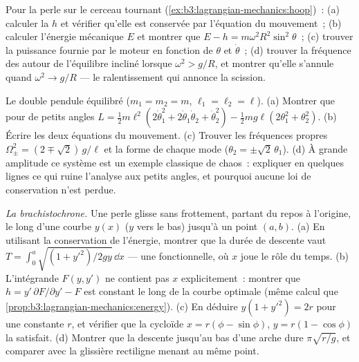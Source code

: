 \begin{exercise}[$\star\star$]\label{exo:b3:lagrangian-mechanics:9}
Pour la perle sur le cerceau tournant
(\cref{ex:b3:lagrangian-mechanics:hoop})~: (a) calculer la  $h$ et vérifier qu'elle est conservée par l'équation du
mouvement~; (b) calculer l'énergie mécanique $E$ et montrer que $E - h =
m\omega^2R^2\sin^2\theta$~; (c) trouver la puissance fournie par le
moteur en fonction de $\theta$ et $\dot\theta$~; (d) trouver la
fréquence des  autour de l'équilibre incliné
lorsque $\omega^2 > g/R$, et montrer qu'elle s'annule quand
$\omega^2 \to g/R$ --- le ralentissement qui annonce la scission.
\end{exercise}

\begin{exercise}[$\star\star\star$]\label{exo:b3:lagrangian-mechanics:10}
Le double pendule équilibré ($m_1 = m_2 = m$, $\ell_1 = \ell_2 = \ell$).
(a) Montrer que pour de petits angles $L = \tfrac12 m\ell^2(2\dot\theta_1^2 +
2\dot\theta_1\dot\theta_2 + \dot\theta_2^2) - \tfrac12 mg\ell(2
\theta_1^2 + \theta_2^2)$. (b) Écrire les deux équations du mouvement.
(c) Trouver les fréquences propres $\Omega_\pm^2 = (2 \mp \sqrt2)\,g/\ell$
et la forme de chaque mode ($\theta_2 = \pm\sqrt2\,\theta_1$). (d) À
grande amplitude ce système est un exemple classique de chaos~:
expliquer en quelques lignes ce qui ruine l'analyse aux petits angles,
et pourquoi aucune loi de conservation n'est perdue.
\end{exercise}

\begin{exercise}[$\star\star\star$]\label{exo:b3:lagrangian-mechanics:11}
\emph{La brachistochrone.} Une perle glisse sans frottement, partant du
repos à l'origine, le long d'une courbe $y(x)$ ($y$ vers le bas)
jusqu'à un point $(a, b)$. (a) En utilisant la conservation de
l'énergie, montrer que la durée de descente vaut $T =
\int_0^a\sqrt{(1 + y'^2)/2gy}\,\dd x$ --- une fonctionnelle, où $x$
joue le rôle du temps. (b) L'intégrande $F(y, y')$ ne contient pas $x$
explicitement~: montrer que $h = y'\,\partial F/\partial y' - F$ est
constant le long de la courbe optimale (même calcul que
\cref{prop:b3:lagrangian-mechanics:energy}). (c) En déduire $y(1 + y'^2) =
2r$ pour une constante $r$, et vérifier que la cycloïde $x = r(\phi -
\sin\phi)$, $y = r(1 - \cos\phi)$ la satisfait. (d) Montrer que la
descente jusqu'au bas d'une arche dure $\pi\sqrt{r/g}$, et comparer
avec la glissière rectiligne menant au même point.
\end{exercise}

